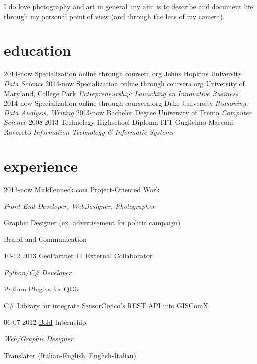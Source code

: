 \documentclass[]{friggeri-cv}
\begin{document}
I do love photography and art in general: my aim is to describe and document life through my personal point of view (and through the lens of my camera).

\section{education}

\begin{entrylist}
  \entry
    {2014-now}
    {Specialization {\normalfont online through coursera.org}}
    {Johns Hopkins University}
    {\emph{Data Science}}
\entry
    {2014-now}
    {Specialization {\normalfont online through coursera.org}}
    {University of Maryland, College Park}
    {\emph{Entrepreneurship: Launching an Innovative Business}}
\entry
    {2014-now}
    {Specialization {\normalfont online through coursera.org}}
    {Duke University}
    {\emph{Reasoning, Data Analysis, Writing}}
\entry
    {2013-now}
    {Bachelor Degree}
    {University of Trento}
    {\emph{Computer Science}}
\entry
    {2008-2013}
    {Technology Highschool Diploma}
    {ITT Guglielmo Marconi - Rovereto}
    {\emph{Information Technology \& Informatic Systems}}

\end{entrylist}

\section{experience}

\begin{entrylist}
  \entry
    {2013-now}
    {\href{http://www.mickfenneck.com}{MickFenneck.com}}
    {Project-Oriented Work}
    {\emph{Front-End Developer, WebDesigner, Photographer}

	{Graphic Designer (ex. advertisement for politic campaign)}

	{Brand and Communication}
    }
\entry
    {10-12 2013}
    {\href{http://www.geopartner.it}{GeoPartner}}
    {IT External Collaborator}
    {\emph{Python/C\# Developer}

	{Python Plugins for QGis}
	
	{C\# Library for integrate SensorCivico's REST API into GISComX}
    }
\entry
    {06-07 2012}
    {\href{http://www.studiobold.it}{Bold}}
    {Internship}
    {\emph{Web/Graphic Designer}

	{Translator (Italian-English, English-Italian)}
    }
\end{entrylist}
\end{document}
